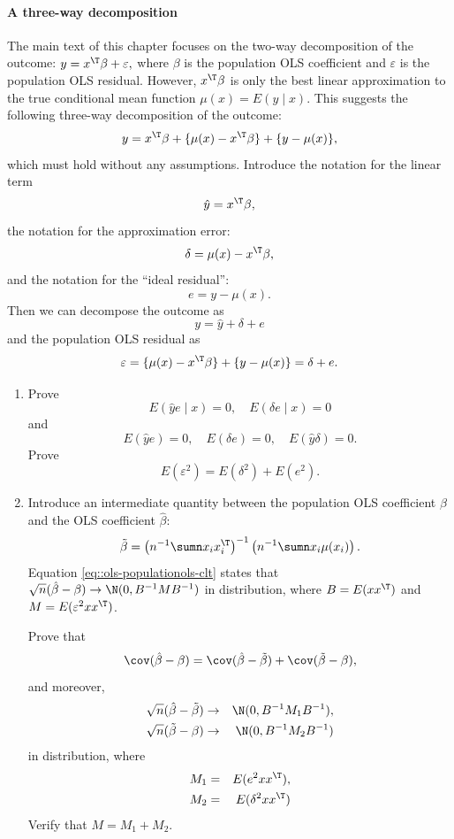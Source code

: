 \paragraph{A three-way decomposition}\label{hw11::three-way-ols}

The main text of this chapter focuses on the two-way decomposition of the outcome:
$
y = x^{\T} \beta + \varepsilon ,
$
where $\beta$ is the population OLS coefficient and $\varepsilon$ is  the population OLS residual. However, $x^{\T} \beta$ is only the best linear approximation to the true conditional mean function $\mu(x) =  E(y \mid x)$. This suggests the following three-way decomposition of the outcome:
$$
y = x^{\T} \beta  + \{ \mu(x)  - x^{\T} \beta \} + \{ y -  \mu(x) \},
$$
which must hold without any assumptions. Introduce the notation for the linear term 
$$
\hat{y} = x^{\T} \beta,
$$ 
 the notation for the approximation error:
$$
\delta = \mu(x)  - x^{\T} \beta ,
$$
and the notation for the
 ``ideal residual'':
$$
e =  y -  \mu(x) .
$$
Then 
we can decompose the outcome as
$$
y = \hat{y}   +   \delta  + e
$$
and
 the population OLS residual as
$$
 \varepsilon  =  \{ \mu(x)  - x^{\T} \beta \} + \{ y -  \mu(x) \} =  \delta  + e. 
$$


\begin{enumerate}
\item
Prove  
$$
E(   \hat{y}    e \mid x ) = 0,\quad
E(   \delta   e \mid x ) = 0
$$
and
$$
E(   \hat{y}    e  ) = 0,\quad
E(   \delta   e   ) = 0,\quad
E(  \hat{y}   \delta  ) = 0.
$$
Prove
$$
E( \varepsilon^2 ) = E(  \delta ^2 ) + E(  e^{2}) . 
$$

\item
Introduce an intermediate quantity between the population OLS coefficient $\beta $ and the OLS coefficient $\hat{\beta} $:
$$
\tilde{\beta} = \left( n^{-1} \sumn x_i x_i^{\T}  \right)^{-1}  \left( n^{-1} \sumn x_i \mu(x_i)  \right).
$$
Equation \eqref{eq::ols-populationols-clt} states that 
$
\sqrt{n} (  \hat{\beta}  - \beta ) \rightarrow \N(0,  B^{-1} M B^{-1} )
$
in distribution, 
where $B = E(xx^{\T})$ and $M = E(\varepsilon^2 xx^{\T})$. 


Prove that 
$$
\cov( \hat{\beta}  - \beta ) = \cov(  \hat{\beta}  - \tilde\beta ) + \cov(   \tilde\beta - \beta  ),
$$
and moreover, 
\begin{eqnarray*}
\sqrt{n} (  \hat{\beta}  - \tilde\beta ) & \rightarrow & \N(0,  B^{-1} M_1 B^{-1} ),\\ 
\sqrt{n} (    \tilde\beta - \beta )  & \rightarrow & \N(0,  B^{-1} M_2 B^{-1} )
\end{eqnarray*}
in distribution, where 
\begin{eqnarray*}
M_1 &=& E(e^{2} xx^{\T}),\\ 
M_2 &=& E( \delta^2 xx^{\T})
\end{eqnarray*}
Verify that $M = M_1 + M_2$. 
\end{enumerate}


